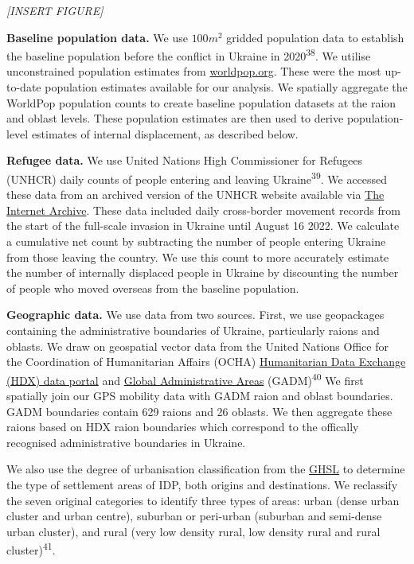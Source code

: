 \documentclass[
  11pt,
]{article}
\begin{document}
\emph{{[}INSERT FIGURE{]}}

\textbf{Baseline population data.} We use \(100m^{2}\) gridded
population data to establish the baseline population before the conflict
in Ukraine in 2020\textsuperscript{38}. We utilise unconstrained
population estimates from
\href{https://www.worldpop.org/}{worldpop.org}. These were the most
up-to-date population estimates available for our analysis. We spatially
aggregate the WorldPop population counts to create baseline population
datasets at the raion and oblast levels. These population estimates are
then used to derive population-level estimates of internal displacement,
as described below.

\textbf{Refugee data.} We use United Nations High Commissioner for
Refugees (UNHCR) daily counts of people entering and leaving
Ukraine\textsuperscript{39}. We accessed these data from an archived
version of the UNHCR website available via
\href{https://web.archive.org/}{The Internet Archive}. These data
included daily cross-border movement records from the start of the
full-scale invasion in Ukraine until August 16 2022. We calculate a
cumulative net count by subtracting the number of people entering
Ukraine from those leaving the country. We use this count to more
accurately estimate the number of internally displaced people in Ukraine
by discounting the number of people who moved overseas from the baseline
population.

\textbf{Geographic data.} We use data from two sources. First, we use
geopackages containing the administrative boundaries of Ukraine,
particularly raions and oblasts. We draw on geospatial vector data from
the United Nations Office for the Coordination of Humanitarian Affairs
(OCHA) \href{https://data.humdata.org/dataset?}{Humanitarian Data
Exchange (HDX) data portal} and \href{https://gadm.org/}{Global
Administrative Areas} (GADM)\textsuperscript{40} We first spatially join
our GPS mobility data with GADM raion and oblast boundaries. GADM
boundaries contain 629 raions and 26 oblasts. We then aggregate these
raions based on HDX raion boundaries which correspond to the offically
recognised administrative boundaries in Ukraine.

We also use the degree of urbanisation classification from the
\href{https://human-settlement.emergency.copernicus.eu/}{GHSL} to
determine the type of settlement areas of IDP, both origins and
destinations. We reclassify the seven original categories to identify
three types of areas: urban (dense urban cluster and urban centre),
suburban or peri-urban (suburban and semi-dense urban cluster), and
rural (very low density rural, low density rural and rural
cluster)\textsuperscript{41}.
\end{document}
